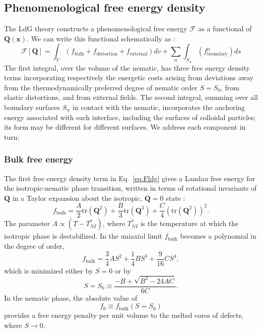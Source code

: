 \documentclass[utf8]{frontiersFPHY} %
\newcommand{\Q}{\mathbf{Q}}
\newcommand{\tr}{\textrm{tr}}
\begin{document}
\subsection{Phenomenological free energy density}
The LdG theory constructs a phenomenological  free energy $\mathcal F$ as a functional of $\Q(\mathbf{x})$. We can write this functional schematically as \citep{ravnik2009landau,mottram2014introduction}:
\begin{equation}\label{eq:Fldg}
\mathcal{F}[\Q] = \int_V \left( f_{\mathrm{bulk}}+f_{\mathrm{distortion}} +f_{\mathrm{external}} \right) dv +  \sum_\alpha \int_{S_\alpha }\left( f_{\mathrm{boundary}}^\alpha \right) ds
\end{equation}
The first integral, over the volume of the nematic, has three  free energy density terms incorporating respectively the energetic costs arising from  deviations away from the thermodynamically preferred degree of nematic order $S=S_0$, from elastic distortions, and from  external fields. The second integral, summing over all boundary surfaces $S_\alpha$ in contact with the nematic, incorporates the anchoring energy associated with each interface, including the surfaces of colloidal particles; its form may be different for different surfaces. We address each component in turn:

\subsubsection{Bulk free energy}
The first free energy density term in Eq.~\ref{eq:Fldg} gives a Landau free energy for the isotropic-nematic phase transition, written in terms of rotational invariants of $\Q$ in a Taylor expansion about the isotropic, $\Q=0$ state \citep{Schophol1987}:
\begin{equation}\label{eq:fphase}
f_{\mathrm{bulk}} = \frac{A}{2} \tr\left(\Q^2\right)+\frac{B}{3} \tr\left(\Q^3\right)+\frac{C}{4} \left(\tr\left(\Q^2\right)\right)^2.
\end{equation}
The parameter $A\propto (T-T_{NI}^*)$, where $T_{NI}^*$ is the temperature at which the isotropic phase is destabilized. In the uniaxial limit $f_{\mathrm{bulk}}$ becomes a polynomial in the degree of order,
\begin{equation} \label{eq:fphaseS}
f_{\mathrm{bulk}} = \frac{3}{4} A S^2  + \frac{1}{4} B S^3 + \frac{9}{16} C S^4,
\end{equation}
which is minimized either  by $S=0$ or by 
\begin{equation} \label{eq:S0def}
S=S_0\equiv \frac{-B+\sqrt{B^2-24AC}}{6C}.
\end{equation}
In the nematic phase, the absolute value of 
\begin{equation}\label{eq:f0}
f_0 \equiv f_{\mathrm{bulk}}(S=S_0)
\end{equation}
provides a free energy penalty per unit volume to the melted cores of defects, where $S\rightarrow 0$. 
\end{document}
